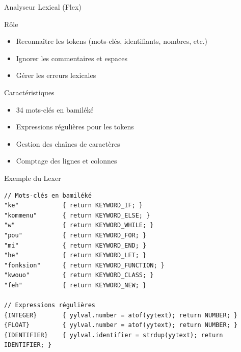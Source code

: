 \documentclass[10pt]{beamer}
\begin{document}
\begin{frame}{Analyseur Lexical (Flex)}
    \begin{block}{Rôle}
        \begin{itemize}
            \item Reconnaître les tokens (mots-clés, identifiants, nombres, etc.)
            \item Ignorer les commentaires et espaces
            \item Gérer les erreurs lexicales
        \end{itemize}
    \end{block}
    
    \begin{block}{Caractéristiques}
        \begin{itemize}
            \item 34 mots-clés en bamiléké
            \item Expressions régulières pour les tokens
            \item Gestion des chaînes de caractères
            \item Comptage des lignes et colonnes
        \end{itemize}
    \end{block}
\end{frame}

\begin{frame}[fragile]{Exemple du Lexer}
    \begin{lstlisting}[style=algi-style, caption={Extrait de algi.l}]
// Mots-clés en bamiléké
"ke"            { return KEYWORD_IF; }
"kommenu"       { return KEYWORD_ELSE; }
"w"             { return KEYWORD_WHILE; }
"pou"           { return KEYWORD_FOR; }
"mi"            { return KEYWORD_END; }
"he"            { return KEYWORD_LET; }
"fonksion"      { return KEYWORD_FUNCTION; }
"kwouo"         { return KEYWORD_CLASS; }
"feh"           { return KEYWORD_NEW; }

// Expressions régulières
{INTEGER}       { yylval.number = atof(yytext); return NUMBER; }
{FLOAT}         { yylval.number = atof(yytext); return NUMBER; }
{IDENTIFIER}    { yylval.identifier = strdup(yytext); return IDENTIFIER; }
\end{lstlisting}
\end{frame}
\end{document}
